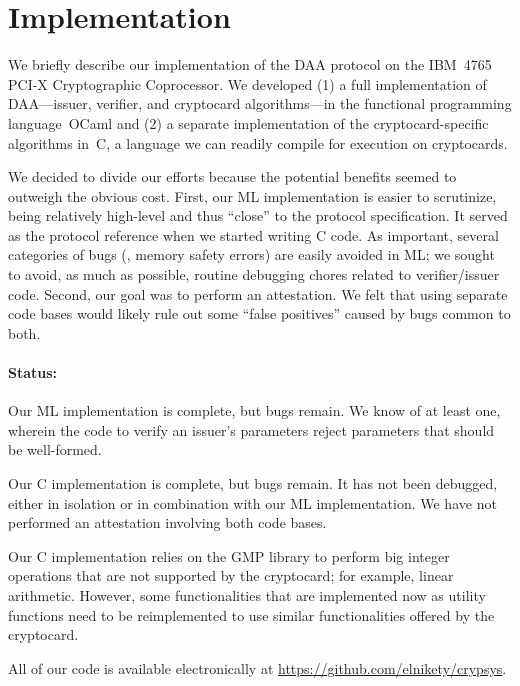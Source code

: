 \section{Implementation}

We briefly describe our implementation of the DAA protocol on the IBM~4765
PCI-X Cryptographic Coprocessor.
We developed (1) a
full implementation of DAA---issuer, verifier, and cryptocard algorithms---in the
functional programming language~OCaml and (2) a separate implementation of the cryptocard-specific algorithms in~C, a language we can readily compile
for execution on cryptocards.

We decided to divide our efforts because the potential benefits seemed to outweigh
the obvious cost.
First, our ML implementation is easier to
scrutinize, being relatively high-level and thus ``close'' to the protocol specification.
It served as the protocol reference when we started writing C code.
As important, several categories of bugs (\eg, memory safety errors) are easily avoided in ML;
we sought to avoid, as much as possible, routine debugging chores related to verifier/issuer code.
Second, our goal was to perform an attestation.
We felt that using separate code bases
would likely rule out some ``false positives'' caused
by bugs common to both.

\paragraph*{Status:}
Our ML implementation is complete, but bugs remain.
We know of at least one, wherein the code to verify an issuer's parameters
reject parameters that should be well-formed.

Our C implementation is complete, but bugs remain.
It has not been debugged, either in isolation
or in combination with our ML implementation. We have
not performed an attestation involving both code bases.

Our C implementation relies on the GMP library
to perform big integer operations that are not supported by the
cryptocard; for example, linear arithmetic. However, some functionalities that are
implemented now as utility functions need to be reimplemented to use similar
functionalities offered by the cryptocard.

All of our code is available electronically at
\url{https://github.com/elnikety/crypsys}.
